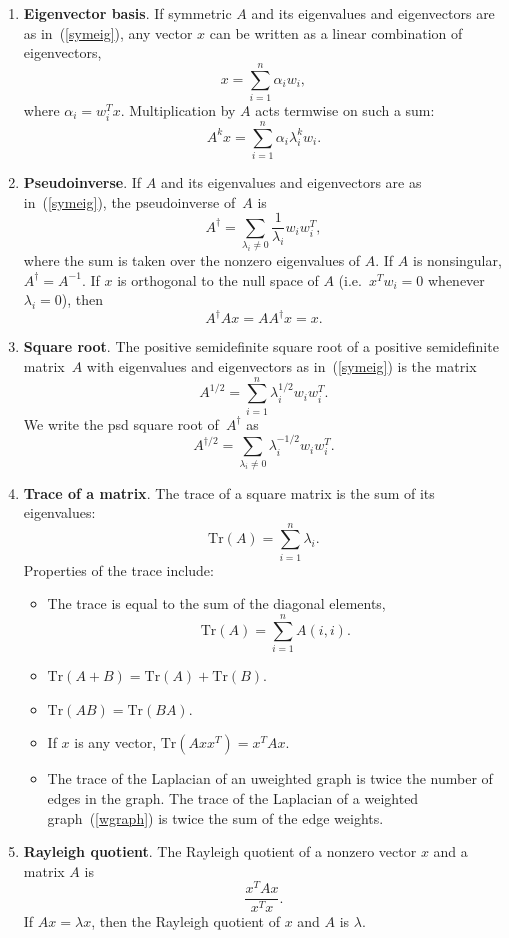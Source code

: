 \documentclass[11pt]{article}
\newcommand{\pinv}{^{\dagger}}          %
\newcommand{\sdroot}{^{1/2}}            %
\newcommand{\pinvroot}{^{\dagger/2}}    %
\newcommand{\Tr}{\mbox{Tr}}             %
\begin{document}
\begin{enumerate}
\item{\bf Eigenvector basis}.
If symmetric $A$ and its eigenvalues and eigenvectors are as in~(\ref{symeig}), 
any vector $x$ can be written as a linear combination of eigenvectors,
$$x = \sum_{i=1}^n \alpha_i w_i,$$
where $\alpha_i = w_i^Tx.$  
Multiplication by $A$ acts termwise on such a sum:
$$A^k x = \sum_{i=1}^n \alpha_i\lambda_i^k w_i.$$

\item{\bf Pseudoinverse}.
If $A$ and its eigenvalues and eigenvectors 
are as in~(\ref{symeig}), 
the pseudoinverse of~$A$ is
$$A\pinv = \sum_{\lambda_i\ne 0} \frac{1}{\lambda_i} w_iw_i^T,$$
where the sum is taken over the nonzero eigenvalues of $A$.
If $A$ is nonsingular, $A\pinv=A^{-1}$.
If $x$ is orthogonal to the null space of $A$ 
(i.e.\ $x^Tw_i=0$ whenever $\lambda_i=0$), then
$$A\pinv A x = AA\pinv x = x.$$

\item{\bf Square root}.
The positive semidefinite square root of a positive semidefinite matrix~$A$
with eigenvalues and eigenvectors as in~(\ref{symeig}) is the matrix
$$A\sdroot = \sum_{i=1}^n \lambda_i^{1/2} w_iw_i^T.$$
We write the psd square root of~$A\pinv$ as 
$$A\pinvroot = \sum_{\lambda_i\ne 0} \lambda_i^{-1/2} w_iw_i^T.$$

\item{\bf Trace of a matrix}.
The trace of a square matrix is the sum of its eigenvalues:
$$\Tr(A) = \sum_{i=1}^n \lambda_i.$$
Properties of the trace include:

\begin{itemize}

\item The trace is equal to the sum of the diagonal elements,
$$\Tr(A) = \sum_{i=1}^n A(i,i).$$

\item $\Tr(A+B) = \Tr(A)+\Tr(B)$.

\item $\Tr(AB) = \Tr(BA)$.

\item If $x$ is any vector, $\Tr(Axx^T) = x^TAx$.

\item The trace of the Laplacian of an uweighted graph is twice the
number of edges in the graph. The trace of the Laplacian of a weighted
graph~(\ref{wgraph}) is twice the sum of the edge weights.

\end{itemize}

\item{\bf Rayleigh quotient}.
The Rayleigh quotient of a nonzero vector $x$ and a matrix $A$ is
$$\frac{x^TAx}{x^Tx}.$$
If $Ax=\lambda x$, then the Rayleigh quotient of $x$ and $A$ is $\lambda$.


\end{enumerate}
\end{document}
